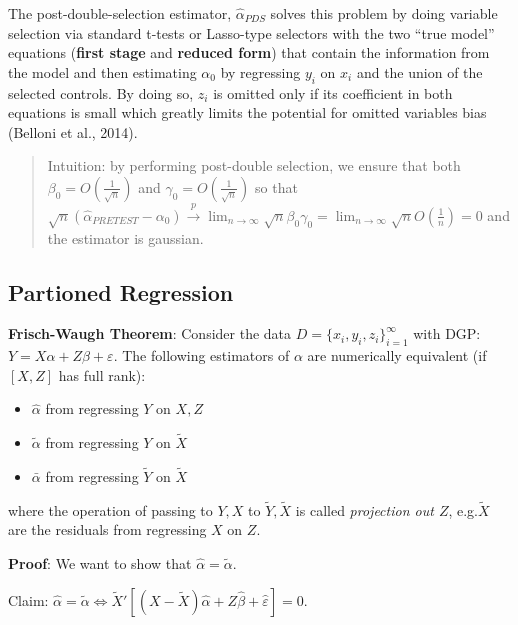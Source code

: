 \documentclass[12pt,]{book}
\providecommand{\tightlist}{%
  \setlength{\itemsep}{0pt}\setlength{\parskip}{0pt}}
\begin{document}
The post-double-selection estimator, \(\hat{\alpha}_{PDS}\) solves this problem by doing variable selection via standard t-tests or Lasso-type selectors with the two ``true model'' equations (\textbf{first stage} and \textbf{reduced form}) that contain the information from the model and then estimating \(\alpha_0\) by regressing \(y_i\) on \(x_i\) and the union of the selected controls. By doing so, \(z_i\) is omitted only if its coefficient in both equations is small which greatly limits the potential for omitted variables bias (Belloni et al., 2014).

\begin{quote}
Intuition: by performing post-double selection, we ensure that both \(\beta_0 = O \left( \frac{1}{\sqrt{n}} \right)\) and \(\gamma_0 = O \left( \frac{1}{\sqrt{n}} \right)\) so that \(\sqrt{n} ( \hat \alpha _ {PRETEST} - \alpha _ 0) \overset{p}{\to} \lim_{n \to \infty} \sqrt{n} \beta_0 \gamma_0 = \lim_{n \to \infty} \sqrt{n} O \left( \frac{1}{n} \right) = 0\) and the estimator is gaussian.
\end{quote}

\hypertarget{partioned-regression}{%
\subsection{Partioned Regression}\label{partioned-regression}}

\textbf{Frisch-Waugh Theorem}:
Consider the data \(D = \{ x_i, y_i, z_i \}_{i=1}^\infty\) with DGP: \(Y = X \alpha + Z \beta + \varepsilon\). The following estimators of \(\alpha\) are numerically equivalent (if \([X, Z]\) has full rank):

\begin{itemize}
\tightlist
\item
  \(\hat{\alpha}\) from regressing \(Y\) on \(X, Z\)
\item
  \(\tilde{\alpha}\) from regressing \(Y\) on \(\tilde{X}\)
\item
  \(\bar{\alpha}\) from regressing \(\tilde{Y}\) on \(\tilde{X}\)
\end{itemize}

where the operation of passing to \(Y, X\) to \(\tilde{Y}, \tilde{X}\) is called \emph{projection out \(Z\)}, e.g.\(\tilde{X}\) are the residuals from regressing \(X\) on \(Z\).

\textbf{Proof}:
We want to show that \(\hat{\alpha} = \tilde{\alpha}\).

Claim: \(\hat{\alpha } = \tilde{\alpha} \Leftrightarrow \tilde{X}' \left[ (X - \tilde{X})\hat{\alpha} + Z \hat{\beta} +\hat{\varepsilon} \right] = 0\).
\end{document}
